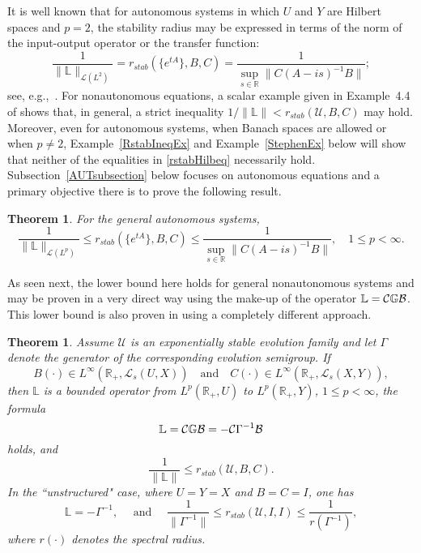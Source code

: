 \documentclass[10pt,psamsfonts,leqno]{siamltex}
\newtheorem{thm}[prop]{Theorem}
\newcommand{\bbR}{\mathbb{R}}
\newcommand{\bbL}{\mathbb{L}}
\newcommand{\lb}{\label}
\newcommand{\U}{\mathcal{U}}
\newcommand{\rstab}{r_{stab}}
\begin{document}
It is well known that for autonomous systems in which
$U$ and $Y$ are Hilbert spaces and $p=2$, the stability radius may
be expressed in terms of the norm of the input-output operator or the
transfer function:
\begin{equation}\lb{rstabHilbeq}
\frac{1}{\|\bbL\|_{\mathcal{L}(L^2)}}=\rstab(\{e^{tA}\},B,C)=
\frac{1}{\sup_{s\in\bbR}\|C(A-is)^{-1}B\|};
\end{equation}
see, e.g.,~\cite[Theorem~3.5]{HP94}.
For nonautonomous  equations, a scalar example given in Example~4.4 of
\cite{HIP89} shows that, in general, a strict inequality
$1/{\|\bbL\|}<\rstab(\U,B,C)$ may hold.
Moreover, even for autonomous systems, when Banach spaces are allowed or
when $p\neq 2$, Example~\ref{RstabIneqEx} and Example~\ref{StephenEx}
below
will show that neither of the equalities in \eqref{rstabHilbeq}
necessarily
hold. Subsection~\ref{AUTsubsection}
below focuses on  autonomous equations and a primary objective
there is to prove the following result.
\begin{thm}\label{autin}
For the general autonomous systems,
\begin{equation}\lb{rstabBanIneq}
\frac{1}{\|\bbL\|_{\mathcal{L}(L^p)}}\le\rstab(\{e^{tA}\},B,C)\le
\frac{1}{\sup_{s\in\bbR}\|C(A-is)^{-1}B\|},
\quad 1\le p<\infty.
\end{equation}
\end{thm}
As seen next, the lower bound here holds for general nonautonomous
systems and may be proven in a very direct way using the make-up of the
operator
$\bbL=\mathcal{C}\Bbb{G}\mathcal{B}$.   This lower bound is also proven
in  \cite[Theorem~3.2]{HP94} using a completely different approach.

\begin{thm}\lb{L0BoundThm}
Assume $\U$ is an exponentially stable evolution family and let $\Gamma$
denote the generator of the corresponding evolution semigroup.  If
$$B(\cdot)\in L^\infty(\bbR_+,\mathcal{L}_s(U,X))\quad\text{and}\quad
C(\cdot)\in L^\infty(\bbR_+,\mathcal{L}_s(X,Y)),$$
then $\bbL$ is a bounded operator from $L^p({\mathbb R}_+,U)$
to $L^p({\mathbb R}_+,Y)$, $1\le p<\infty$, the formula
$${\mathbb L}=\mathcal{C}\Bbb{G}\mathcal{B}
=-\mathcal{C}\Gamma^{-1}\mathcal{B}$$
holds, and
\begin{equation}\lb{LowerRstabBound}
\frac{1}{\|\bbL\|}\le \rstab(\U,B,C).
\end{equation}
In the ``unstructured" case, where $U=Y=X$ and $B=C=I$, one has
\[\bbL=-\Gamma^{-1},\quad\mbox{ and }\quad
\frac{1}{\|\Gamma^{-1}\|} \le \rstab(\U,I,I) \le
\frac{1}{r(\Gamma^{-1})},
\]
where $r(\cdot)$ denotes the spectral radius.
\end{thm}
\end{document}
